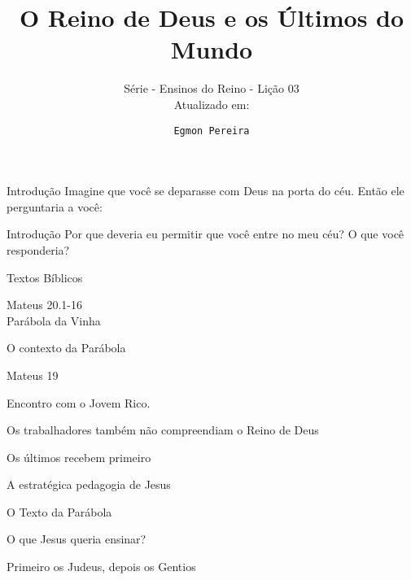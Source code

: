 \documentclass[compress]{beamer}
\title{O Reino de Deus e os Últimos do Mundo}
\subtitle{Série - Ensinos do Reino - Lição 03 \\ Atualizado em: }
\author{\texttt{Egmon Pereira}}
\institute{\texttt{Baseado nos Estudos Ensinos do Reino - Ed. Didaquê}}
\begin{document}
\begin{frame}
\titlepage

\end{frame}

\begin{frame}{Introdução}
\centering
{\Huge Imagine que você se deparasse com Deus na porta do céu. Então ele perguntaria a você: }
\end{frame}

\begin{frame}{Introdução}
\centering
{\Huge Por que deveria eu permitir que você entre no meu céu? 
\pause
O que você responderia? }
\end{frame}

\begin{frame}{Textos Bíblicos}

\begin{itemize}

{\Huge \item[•] Mateus 20.1-16\\
Parábola da Vinha}

\end{itemize}
\end{frame}

\begin{frame}{O contexto da Parábola}
\begin{itemize}
{\huge \item[•] Mateus 19
\item[•] Encontro com o Jovem Rico.
\pause
\item[•] Os trabalhadores também não compreendiam o Reino de Deus
\pause
\item[•] Os últimos recebem primeiro}
\pause

\begin{itemize}
{\huge \item[•] A estratégica pedagogia de Jesus}
\end{itemize}

\end{itemize}
\end{frame}

\begin{frame}{O Texto da Parábola}
\begin{itemize}
{\huge \item[•] O que Jesus queria ensinar?
\item[•] Primeiro os Judeus, depois os Gentios}
\end{itemize}
\end{frame}
\end{document}
